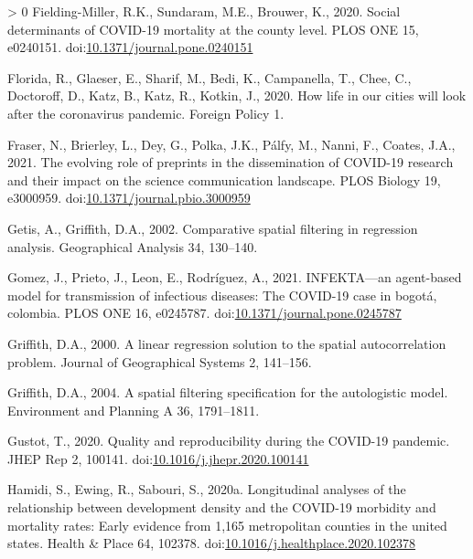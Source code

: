 \documentclass[]{elsarticle} %
\newlength{\cslhangindent}
\newenvironment{CSLReferences}[3] %
 {%
  \setlength{\parindent}{0pt}
  \ifodd #1 \everypar{\setlength{\hangindent}{\cslhangindent}}\ignorespaces\fi
  \ifnum #2 > 0
  \setlength{\parskip}{#2\baselineskip}
  \fi
 }%
 {}
\begin{document}
\begin{CSLReferences}{1}{0}
\leavevmode\hypertarget{ref-Fielding2020social}{}%
Fielding-Miller, R.K., Sundaram, M.E., Brouwer, K., 2020. Social
determinants of COVID-19 mortality at the county level. PLOS ONE 15,
e0240151.
doi:\href{https://doi.org/10.1371/journal.pone.0240151}{10.1371/journal.pone.0240151}

\leavevmode\hypertarget{ref-Florida2020how}{}%
Florida, R., Glaeser, E., Sharif, M., Bedi, K., Campanella, T., Chee,
C., Doctoroff, D., Katz, B., Katz, R., Kotkin, J., 2020. How life in our
cities will look after the coronavirus pandemic. Foreign Policy 1.

\leavevmode\hypertarget{ref-Fraser2021evolving}{}%
Fraser, N., Brierley, L., Dey, G., Polka, J.K., Pálfy, M., Nanni, F.,
Coates, J.A., 2021. The evolving role of preprints in the dissemination
of COVID-19 research and their impact on the science communication
landscape. PLOS Biology 19, e3000959.
doi:\href{https://doi.org/10.1371/journal.pbio.3000959}{10.1371/journal.pbio.3000959}

\leavevmode\hypertarget{ref-Getis2002comparative}{}%
Getis, A., Griffith, D.A., 2002. Comparative spatial filtering in
regression analysis. Geographical Analysis 34, 130--140.

\leavevmode\hypertarget{ref-Gomez2021infekta}{}%
Gomez, J., Prieto, J., Leon, E., Rodríguez, A., 2021. INFEKTA---an
agent-based model for transmission of infectious diseases: The COVID-19
case in bogotá, colombia. PLOS ONE 16, e0245787.
doi:\href{https://doi.org/10.1371/journal.pone.0245787}{10.1371/journal.pone.0245787}

\leavevmode\hypertarget{ref-Griffith2000linear}{}%
Griffith, D.A., 2000. A linear regression solution to the spatial
autocorrelation problem. Journal of Geographical Systems 2, 141--156.

\leavevmode\hypertarget{ref-Griffith2004spatial}{}%
Griffith, D.A., 2004. A spatial filtering specification for the
autologistic model. Environment and Planning A 36, 1791--1811.

\leavevmode\hypertarget{ref-Gustot2020quality}{}%
Gustot, T., 2020. Quality and reproducibility during the COVID-19
pandemic. JHEP Rep 2, 100141.
doi:\href{https://doi.org/10.1016/j.jhepr.2020.100141}{10.1016/j.jhepr.2020.100141}

\leavevmode\hypertarget{ref-Hamidi2020longitudinal}{}%
Hamidi, S., Ewing, R., Sabouri, S., 2020a. Longitudinal analyses of the
relationship between development density and the COVID-19 morbidity and
mortality rates: Early evidence from 1,165 metropolitan counties in the
united states. Health \& Place 64, 102378.
doi:\href{https://doi.org/10.1016/j.healthplace.2020.102378}{10.1016/j.healthplace.2020.102378}


\end{CSLReferences}
\end{document}
